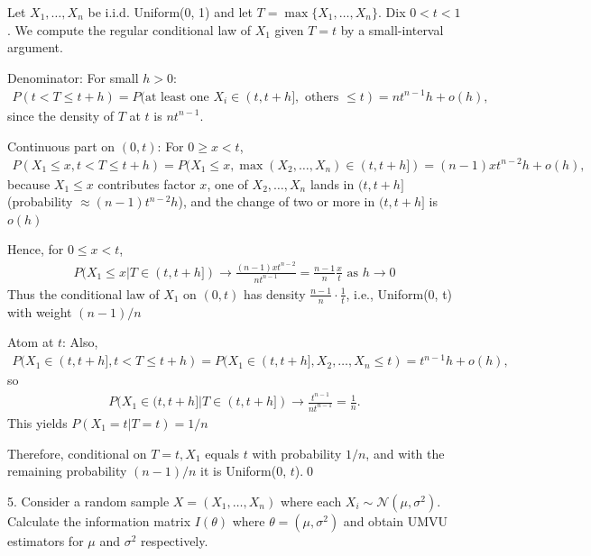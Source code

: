 \documentclass[10pt]{article}
\begin{document}
Let $X_1, …, X_n $ be i.i.d. Uniform(0, 1) and let $T = \max\{X_1, …, X_n\}$. Dix $0 < t < 1 $. We compute the regular conditional law of $X_1 $ given $T = t $ by a small-interval argument.

Denominator: For small $h > 0: $
\begin{gather*}
    P(t < T \le t + h) = P(\text{at least one }X_i \in (t, t + h], \text{ others }\le t) = nt^{n - 1}h + o(h),
\end{gather*}
since the density of $T $ at $t $ is $nt^{n - 1}$.

Continuous part on $(0, t)$: For $0 \ge x < t $,
\begin{gather*}
    P(X_1 \le x, t < T \le t + h) = P(X_1 \le x, \max(X_2, …, X_n)\in(t, t + h]) = (n - 1)xt^{n - 2}h + o(h),
\end{gather*}
because $X_1 \le x $ contributes factor $x $, one of $X_2, …, X_n $ lands in $(t, t + h]$ (probability $\approx (n - 1)t^{n - 2}h$), and the change of two or more in $(t, t + h]$ is $o(h) $

Hence, for $0 \le x < t $,
\begin{gather*}
    P(X_1 \le x | T \in (t, t + h]) \to \frac{(n - 1)xt^{n - 2}}{nt^{n - 1}} = \frac{n - 1}{n} \frac{x}{t} \text{ as }h \to 0
\end{gather*}
Thus the conditional law of $X_1 $ on $(0, t)$ has density $\frac{n - 1}{n} \cdot \frac{1}{t}$, i.e., Uniform(0, t) with weight $(n - 1) / n $

Atom at $t $: Also,
\begin{gather*}
    P(X_1\in (t, t + h], t < T \le t + h) = P(X_1\in (t, t + h], X_2, …, X_n \le t) = t^{n - 1}h + o(h),
\end{gather*}
so
\begin{gather*}
    P(X_1\in (t, t + h] | T \in (t, t + h]) \to \frac{t^{n - 1}}{nt^{n - 1}} = \frac{1}{n}.
\end{gather*}
This yields $P(X_1 = t | T = t) = 1 / n $

Therefore, conditional on $T = t, X_1 $ equals $t $ with probability $1 / n $, and with the remaining probability $(n - 1) / n $ it is Uniform(0, $t$).\qed

\newpage  

5. Consider a random sample $X = (X_1, …, X_n)$ where each $X_i \sim \mathcal{N}(\mu, \sigma^2)$. Calculate the information matrix $I(\theta)$ where $\theta = (\mu, \sigma^2)$ and obtain UMVU estimators for $\mu $ and $\sigma^2 $ respectively. 
\end{document}
